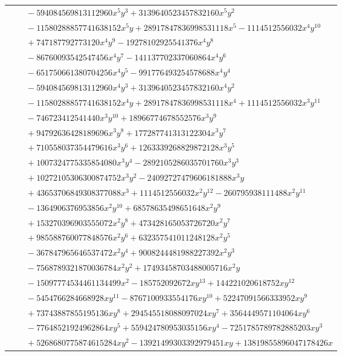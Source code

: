 \documentclass[11pt]{article}
\begin{document}
\begin{longtable}{@{}ll@{}}
 & $\quad -594084569813112960x^{5}y^{3}+3139640523457832160x^{5}y^{2}$\\
 & $\quad -11580288857741638152x^{5}y+28917847836998531118x^{5}-1114512556032x^{4}y^{10}$\\
 & $\quad +747187792773120x^{4}y^{9}-19278102925541376x^{4}y^{8}$\\
 & $\quad -86760093542547456x^{4}y^{7}-141137702337060864x^{4}y^{6}$\\
 & $\quad -651750661380704256x^{4}y^{5}-991776493254578688x^{4}y^{4}$\\
 & $\quad -594084569813112960x^{4}y^{3}+3139640523457832160x^{4}y^{2}$\\
 & $\quad -11580288857741638152x^{4}y+28917847836998531118x^{4}+1114512556032x^{3}y^{11}$\\
 & $\quad -746723412541440x^{3}y^{10}+18966774678552576x^{3}y^{9}$\\
 & $\quad +94792636428189696x^{3}y^{8}+177287741313122304x^{3}y^{7}$\\
 & $\quad +710558037354479616x^{3}y^{6}+1263339268829872128x^{3}y^{5}$\\
 & $\quad +1007324775335854080x^{3}y^{4}-2892105286035701760x^{3}y^{3}$\\
 & $\quad +10272105306300874752x^{3}y^{2}-24092727479606181888x^{3}y$\\
 & $\quad +43653706849308377088x^{3}+1114512556032x^{2}y^{12}-260795938111488x^{2}y^{11}$\\
 & $\quad -1364906376953856x^{2}y^{10}+68578635498651648x^{2}y^{9}$\\
 & $\quad +153270396903555072x^{2}y^{8}+473428165053726720x^{2}y^{7}$\\
 & $\quad +985588760077848576x^{2}y^{6}+632357541011248128x^{2}y^{5}$\\
 & $\quad -367847965646537472x^{2}y^{4}+9008244481988227392x^{2}y^{3}$\\
 & $\quad -7568789321870036784x^{2}y^{2}+17493458703488005716x^{2}y$\\
 & $\quad -15097774534461134499x^{2}-185752092672xy^{13}+144221020618752xy^{12}$\\
 & $\quad -5454766284668928xy^{11}-8767100933554176xy^{10}+52247091566333952xy^{9}$\\
 & $\quad +73743887855195136xy^{8}+294545518088097024xy^{7}+3564449571104064xy^{6}$\\
 & $\quad -77648521924962864xy^{5}+559424780953035156xy^{4}-7251785789782885203xy^{3}$\\
 & $\quad +5268680775874615284xy^{2}-13921499303392979451xy+13819855896047178426x$\\

\end{longtable}
\end{document}
